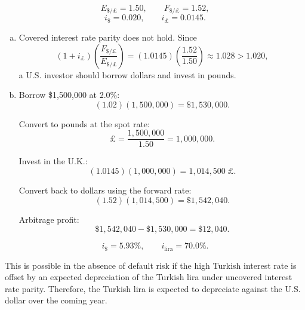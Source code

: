 \documentclass[11pt]{article}
\newenvironment{problem}[2][Problem]{\begin{trivlist}
\item[\hskip \labelsep {\bfseries #1}\hskip \labelsep {\bfseries #2.}]
\leavevmode\par
}{\end{trivlist}}
\begin{document}
\begin{problem}{2}

\[
E_{\$/\pounds} = 1.50, \qquad F_{\$/\pounds} = 1.52,
\]
\[
i_{\$} = 0.020, \qquad i_{\pounds} = 0.0145.
\]

\begin{enumerate}[(a)]
\item Covered interest rate parity does not hold. Since
\[
(1+i_{\pounds})\left(\frac{F_{\$/\pounds}}{E_{\$/\pounds}}\right)
= (1.0145)\left(\frac{1.52}{1.50}\right)
\approx 1.028 > 1.020,
\]a U.S. investor should borrow dollars and invest in pounds.

\item Borrow \$1{,}500{,}000 at 2.0\%:
\[
(1.02)(1{,}500{,}000) = \$1{,}530{,}000.
\]

Convert to pounds at the spot rate:
\[
\pounds = \frac{1{,}500{,}000}{1.50} = 1{,}000{,}000.
\]

Invest in the U.K.:
\[
(1.0145)(1{,}000{,}000) = 1{,}014{,}500\ \pounds.
\]

Convert back to dollars using the forward rate:
\[
(1.52)(1{,}014{,}500) = \$1{,}542{,}040.
\]

Arbitrage profit:
\[
\$1{,}542{,}040 - \$1{,}530{,}000
= \$12{,}040.
\]
\end{enumerate}

\end{problem}

\begin{problem}{3}

\[
i_{\$} = 5.93\%, \qquad i_{\text{lira}} = 70.0\%.
\]

This is possible in the absence of default risk if the high Turkish interest rate is offset by an
expected depreciation of the Turkish lira under uncovered interest rate parity. Therefore, the Turkish lira is expected to depreciate against the U.S. dollar over the coming year.

\end{problem}
\end{document}
